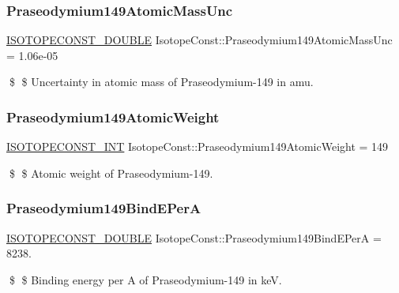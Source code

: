 \subsubsection{\texorpdfstring{Praseodymium149\+Atomic\+Mass\+Unc}{Praseodymium149AtomicMassUnc}}
{\footnotesize\ttfamily \mbox{\hyperlink{group___isotope_const-_macros_ga8f45a7272ce02c0b4c65c44636ed719a}{I\+S\+O\+T\+O\+P\+E\+C\+O\+N\+S\+T\+\_\+\+D\+O\+U\+B\+LE}} Isotope\+Const\+::\+Praseodymium149\+Atomic\+Mass\+Unc = 1.\+06e-\/05}

\$ \$ Uncertainty in atomic mass of Praseodymium-\/149 in amu. \mbox{\label{group___isotope_const-_praseodymium-_pr149_gafec4527c39affbada6cac125cc3a4fcc}} 
\subsubsection{\texorpdfstring{Praseodymium149\+Atomic\+Weight}{Praseodymium149AtomicWeight}}
{\footnotesize\ttfamily \mbox{\hyperlink{group___isotope_const-_macros_ga5f18360b3e99483a35c32d789e62621c}{I\+S\+O\+T\+O\+P\+E\+C\+O\+N\+S\+T\+\_\+\+I\+NT}} Isotope\+Const\+::\+Praseodymium149\+Atomic\+Weight = 149}

\$ \$ Atomic weight of Praseodymium-\/149. \mbox{\label{group___isotope_const-_praseodymium-_pr149_gaf8ca5655821512ebafd947fb5d64036a}} 
\subsubsection{\texorpdfstring{Praseodymium149\+Bind\+E\+PerA}{Praseodymium149BindEPerA}}
{\footnotesize\ttfamily \mbox{\hyperlink{group___isotope_const-_macros_ga8f45a7272ce02c0b4c65c44636ed719a}{I\+S\+O\+T\+O\+P\+E\+C\+O\+N\+S\+T\+\_\+\+D\+O\+U\+B\+LE}} Isotope\+Const\+::\+Praseodymium149\+Bind\+E\+PerA = 8238.}

\$ \$ Binding energy per A of Praseodymium-\/149 in keV. \mbox{\label{group___isotope_const-_praseodymium-_pr149_ga2246f1c4dda8e8e16ad066316a37b25d}} 
